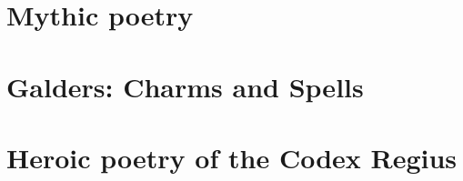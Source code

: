 
\frontmatter%

%

\mainmatter%

\part{Mythic poetry}%

\part{Galders: Charms and Spells}

\part{Heroic poetry of the Codex Regius}%
	



